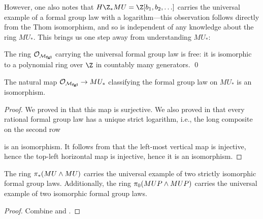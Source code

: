 However, one also notes that \(H\Z_* MU = \Z[b_1, b_2, \ldots]\) carries the universal example of a formal group law with a logarithm---this observation follows directly from the Thom isomorphism, and so is independent of any knowledge about the ring \(MU_*\).  This brings us one step away from understanding \(MU_*\):

\begin{theorem}\label{DummyLazardsThm}
The ring \(\mathcal{O}_{\mathcal{M}_{\mathbf{fgl}}}\) carrying the universal formal group law is free: it is isomorphic to a polynomial ring over \(\Z\) in countably many generators. \qed
\end{theorem}

\begin{corollary}\label{QuillensTheorem}
The natural map \(\mathcal{O}_{\mathcal{M}_{\mathbf{fgl}}} \to MU_*\) classifying the formal group law on \(MU_*\) is an isomorphism.
\end{corollary}
\begin{proof}
We proved in  that this map is surjective.  We also proved in  that every rational formal group law has a unique strict logarithm, i.e., the long composite on the second row
\begin{center}
\end{center}
is an isomorphism.  It follows from  that the left-most vertical map is injective, hence the top-left horizontal map is injective, hence it is an isomorphism.
\end{proof}

\begin{corollary}
The ring \(\pi_*(MU \wedge MU)\) carries the universal example of two strictly isomorphic formal group laws.  Additionally, the ring \(\pi_0 (MUP \wedge MUP)\) carries the universal example of two isomorphic formal group laws.
\end{corollary}
\begin{proof}
Combine  and .
\end{proof}


















